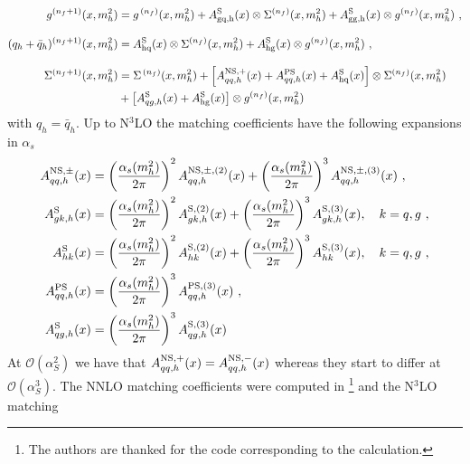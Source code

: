 \begin{align}
\label{eq:hp-nf1}
  g^{(n_f+1)}(x,m_h^2)  &=
    g^{\, (n_f)}(x,m_h^2) +
    A_{\rm gq,h}^{\rm S}(x) \otimes \Sigma^{(n_f)}(x,m_h^2) +
    A_{\rm gg,h}^{\rm S}(x) \otimes g^{(n_f)}(x,m_h^2) \ ,
  \nonumber \\[0.3cm]
  (q_h+\bar{q}_{h})^{(n_f+1)}(x,m_h^2)  &=
  A_{\rm hq}^{\rm S}(x)\otimes \Sigma^{(n_f)}(x,m_h^2) 
  + A_{\rm hg}^{\rm S}(x)\otimes g^{(n_f)}(x,m_h^2)\ ,  \nonumber \\[0.3cm]
  \Sigma^{(n_f+1)}(x,m_h^2)  &= \Sigma^{\, (n_f)}(x,m_h^2) + \left[ A^{\rm NS,+}_{qq,h}(x) + A^{\rm PS}_{qq,h}(x) + A_{\rm hq}^{\rm S}(x)\right] \otimes \Sigma^{(n_f)}(x,m_h^2) \nonumber \\
  & + \left[ A^{\rm S}_{qg,h}(x) + A_{\rm hg}^{\rm S}(x) \right] \otimes g^{(n_f)}(x,m_h^2)
\end{align}
with $q_h=\bar{q}_h$. Up to N$^3$LO the matching coefficients have the
following expansions in $\alpha_s$
\begin{align}
  A^{\rm NS,\pm}_{qq,h}(x) & = \left( \frac{\alpha_s(m_h^2)}{2\pi} \right)^2
  A^{\rm NS,\pm,(2)}_{qq,h}(x) + \left( \frac{\alpha_s(m_h^2)}{2\pi} \right)^3
  A^{\rm NS,\pm,(3)}_{qq,h}(x) \ , \nonumber \\
  A^{\rm S}_{gk,h}(x) & = \left( \frac{\alpha_s(m_h^2)}{2\pi} \right)^2
  A^{\rm S,(2)}_{gk,h}(x) + \left( \frac{\alpha_s(m_h^2)}{2\pi} \right)^3
  A^{\rm S,(3)}_{gk,h}(x), \quad k=q,g \ , \nonumber \\
  A^{\rm S}_{hk}(x) & = \left( \frac{\alpha_s(m_h^2)}{2\pi} \right)^2
  A^{\rm S,(2)}_{hk}(x) + \left( \frac{\alpha_s(m_h^2)}{2\pi} \right)^3
  A^{\rm S,(3)}_{hk}(x), \quad k=q,g \ , \nonumber \\
  A^{\rm PS}_{qq,h}(x) & = \left( \frac{\alpha_s(m_h^2)}{2\pi} \right)^3
  A^{\rm PS,(3)}_{qq,h}(x) \ , \nonumber \\
  A^{\rm S}_{qg,h}(x) & = \left( \frac{\alpha_s(m_h^2)}{2\pi} \right)^3
  A^{\rm S,(3)}_{qg,h}(x)
\end{align}
At $\mathcal{O}(\alpha_S^2)$ we have that $A^{\rm NS,+}_{qq,h}(x) =
A^{\rm NS,-}_{qq,h}(x)$ whereas they start to differ at
$\mathcal{O}(\alpha_S^3)$. The NNLO matching coefficients were
computed in \cite{NNLO-MTM}\footnote{The authors are thanked for the
code corresponding to the calculation.} and the N$^3$LO matching
